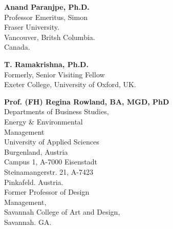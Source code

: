 \begin{multicols}{2}
\begin{trivlist}
\itemsep=12pt
\item \textbf{Anand Paranjpe, Ph.D.}\\ 
Professor Emeritus, Simon\\ Fraser University.\\ 
Vancouver, Britsh Columbia.\\ 
Canada.
 
\item \textbf{T. Ramakrishna, Ph.D.}\\ 
Formerly, Senior Visiting Fellow\\
Exeter College, University of Oxford, UK.
\vfill

\item \textbf{Prof. (FH) Regina Rowland, BA, MGD, PhD}\\ 
Departments of Business Studies,\\ 
Energy \& Environmental\\ Management\\
University of Applied Sciences\\ Burgenland, Austria\\
Campus 1, A-7000 Eisenstadt\\
Steinamangerstr. 21, A-7423\\ Pinkafeld. Austria.\\
Former Professor of Design\\ Management,\\ 
Savannah College of Art and Design,\\ Savannah. GA.
\end{trivlist}
\end{multicols}
